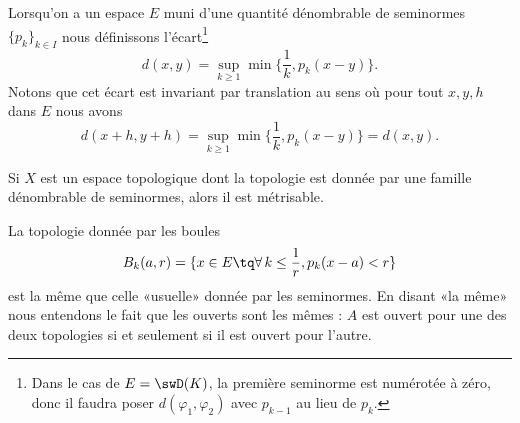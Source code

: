 Lorsqu'on a un espace \( E\) muni d'une quantité dénombrable de seminormes \( \{ p_k \}_{k\in I}\) nous définissons l'écart\footnote{Dans le cas de \( E=\swD(K)\), la première seminorme est numérotée à zéro, donc il faudra poser \( d(\varphi_1,\varphi_2)\) avec \( p_{k-1}\) au lieu de \( p_k\).}
\begin{equation}        \label{EqAAghiUR}
	d(x,y)=\sup_{k\geq 1}\min\big\{  \frac{1}{ k },p_k(x-y) \big\}.
\end{equation}
Notons que cet écart est invariant par translation au sens où pour tout \( x,y,h\) dans \( E\) nous avons
\begin{equation}
	d(x+h,y+h)=\sup_{k\geq 1}\min\big\{ \frac{1}{ k },p_k(x-y) \big\}=d(x,y).
\end{equation}


\begin{proposition}     \label{PROPooMJEQooHtIyeX}
	Si \( X\) est un espace topologique dont la topologie est donnée par une famille dénombrable de seminormes, alors il est métrisable.
\end{proposition}

\begin{proposition} \label{PropLOwUvCO}
	La topologie donnée par les boules
	\begin{equation}    \label{EqGHfYIlQ}
		B_k(a,r)=\{ x\in E\tq \forall\,k\leq \frac{1}{ r },p_k(x-a)<r\}
	\end{equation}
	est la même que celle «usuelle» donnée par les seminormes. En disant «la même» nous entendons le fait que les ouverts sont les mêmes : \( A\) est ouvert pour une des deux topologies si et seulement si il est ouvert pour l'autre.
\end{proposition}

